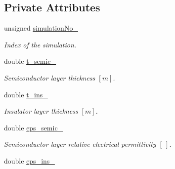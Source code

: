 \subsection*{Private Attributes}
\begin{DoxyCompactItemize}
\item 
\hypertarget{classParamList_af9bb206ec2cb223298bf327f49a66dbb}{unsigned \hyperlink{classParamList_af9bb206ec2cb223298bf327f49a66dbb}{simulation\-No\-\_\-}}\label{classParamList_af9bb206ec2cb223298bf327f49a66dbb}

\begin{DoxyCompactList}\small\item\em Index of the simulation. \end{DoxyCompactList}\item 
\hypertarget{classParamList_a6426d12d32a3ce5d29b3e07d0d38135e}{double \hyperlink{classParamList_a6426d12d32a3ce5d29b3e07d0d38135e}{t\-\_\-semic\-\_\-}}\label{classParamList_a6426d12d32a3ce5d29b3e07d0d38135e}

\begin{DoxyCompactList}\small\item\em Semiconductor layer thickness $ \left[ m \right] $. \end{DoxyCompactList}\item 
\hypertarget{classParamList_a717b3f1de64266eaceab61126bef1a66}{double \hyperlink{classParamList_a717b3f1de64266eaceab61126bef1a66}{t\-\_\-ins\-\_\-}}\label{classParamList_a717b3f1de64266eaceab61126bef1a66}

\begin{DoxyCompactList}\small\item\em Insulator layer thickness $ \left[ m \right] $. \end{DoxyCompactList}\item 
\hypertarget{classParamList_a7fa983e3f32d938c0cd7a484175e96d3}{double \hyperlink{classParamList_a7fa983e3f32d938c0cd7a484175e96d3}{eps\-\_\-semic\-\_\-}}\label{classParamList_a7fa983e3f32d938c0cd7a484175e96d3}

\begin{DoxyCompactList}\small\item\em Semiconductor layer relative electrical permittivity $ \left[ ~ \right] $. \end{DoxyCompactList}\item 
\hypertarget{classParamList_ab41bd9f20128245949cd8cb145041bac}{double \hyperlink{classParamList_ab41bd9f20128245949cd8cb145041bac}{eps\-\_\-ins\-\_\-}}\label{classParamList_ab41bd9f20128245949cd8cb145041bac}


\end{DoxyCompactItemize}
